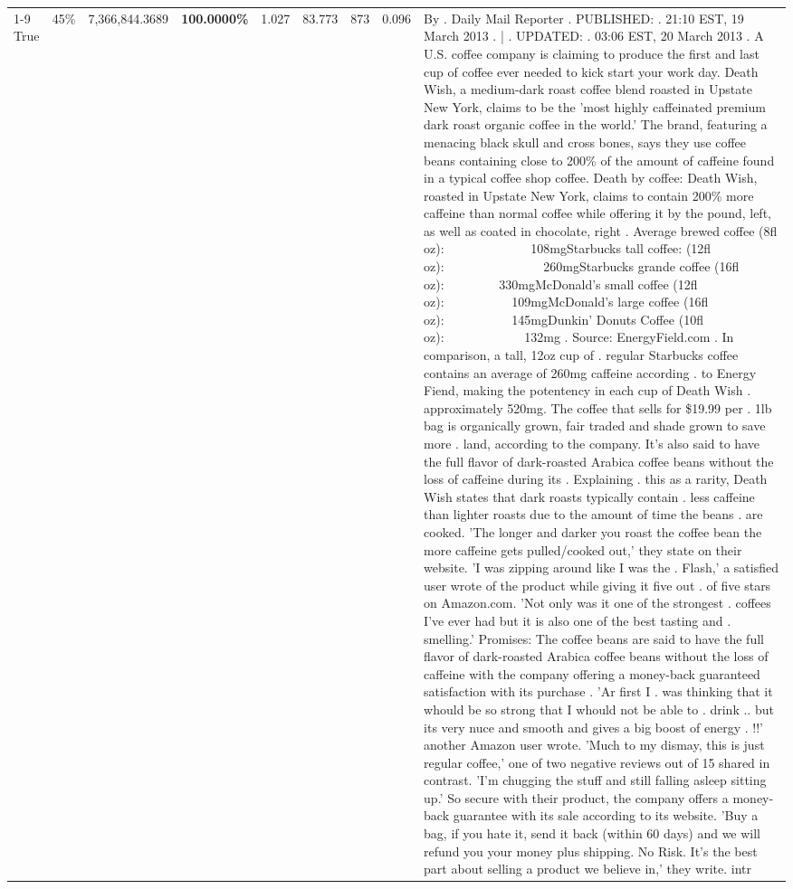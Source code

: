 \begin{table}[H]
{\begin{tabular}{lllrlllll}
\cline{1-9} \cline{2-9}
True & 45\% & 7,366,844.3689 & \bfseries \color{red} 100.0000\% & 1.027 & 83.773 & 873 & 0.096 & By . Daily Mail Reporter . PUBLISHED: . 21:10 EST, 19 March 2013 . | . UPDATED: . 03:06 EST, 20 March 2013 . A U.S. coffee company is claiming to produce the first and last cup of coffee ever needed to kick start your work day. Death Wish, a medium-dark roast coffee blend roasted in Upstate New York, claims to be the 'most highly caffeinated premium dark roast organic coffee in the world.' The brand, featuring a menacing black skull and cross bones, says they use coffee beans containing close to 200\% of the amount of caffeine found in a typical coffee shop coffee. Death by coffee: Death Wish, roasted in Upstate New York, claims to contain 200\% more caffeine than normal coffee while offering it by the pound, left, as well as coated in chocolate, right . Average brewed coffee (8fl oz):              108mgStarbucks tall coffee: (12fl oz):                260mgStarbucks grande coffee (16fl oz):         330mgMcDonald's small coffee (12fl oz):           109mgMcDonald's large coffee (16fl oz):           145mgDunkin' Donuts Coffee (10fl oz):             132mg . Source: EnergyField.com . In comparison, a tall, 12oz cup of . regular Starbucks coffee contains an average of 260mg caffeine according . to Energy Fiend, making the potentency in each cup of Death Wish . approximately 520mg. The coffee that sells for \$19.99 per . 1lb bag is organically grown, fair traded and shade grown to save more . land, according to the company. It's also said to have the full flavor of dark-roasted Arabica coffee beans without the loss of caffeine during its . Explaining . this as a rarity, Death Wish states that dark roasts typically contain . less caffeine than lighter roasts due to the amount of time the beans . are cooked. 'The longer and darker you roast the coffee bean the more caffeine gets pulled/cooked out,' they state on their website. 'I was zipping around like I was the . Flash,' a satisfied user wrote of the product while giving it five out . of five stars on Amazon.com. 'Not only was it one of the strongest . coffees I've ever had but it is also one of the best tasting and . smelling.’ Promises: The coffee beans are said to have the full flavor of dark-roasted Arabica coffee beans without the loss of caffeine with the company offering a money-back guaranteed satisfaction with its purchase . 'Ar first I . was thinking that it whould be so strong that I whould not be able to . drink .. but its very nuce and smooth and gives a big boost of energy . !!' another Amazon user wrote. 'Much to my dismay, this is just regular coffee,' one of two negative reviews out of 15 shared in contrast. 'I'm chugging the stuff and still falling asleep sitting up.' So secure with their product, the company offers a money-back guarantee with its sale according to its website. 'Buy a bag, if you hate it, send it back (within 60 days) and we will refund you your money plus shipping. No Risk. It’s the best part about selling a product we believe in,' they write. intr \\

\end{tabular}}
\end{table}
